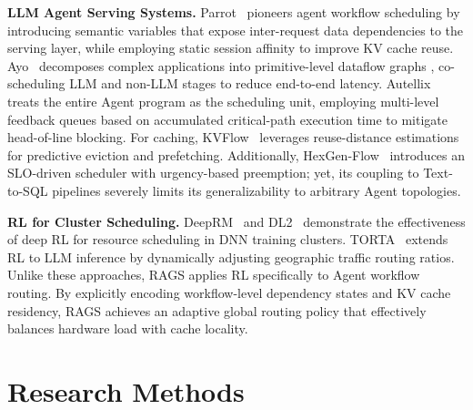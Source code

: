 \documentclass[sigconf,review,anonymous]{acmart}
\begin{document}
\textbf{LLM Agent Serving Systems.}
Parrot~\cite{lin2024parrot} pioneers agent workflow scheduling by introducing semantic 
variables that expose inter-request data dependencies to the serving layer, while 
employing static session affinity to improve KV cache reuse. 
Ayo~\cite{tan2025towards}
decomposes complex applications into primitive-level dataflow graphs
, co-scheduling LLM and non-LLM stages to reduce end-to-end latency. 
Autellix~\cite{luo2025autellix} treats the entire Agent program as the scheduling unit, 
employing multi-level feedback queues based on accumulated critical-path execution time 
to mitigate head-of-line blocking. For caching, KVFlow~\cite{pan2025kvflow} leverages 
reuse-distance estimations for predictive eviction and prefetching. Additionally, HexGen-Flow~\cite{peng2025hexgen} introduces an SLO-driven 
scheduler with urgency-based preemption; yet, its coupling to Text-to-SQL pipelines 
severely limits its generalizability to arbitrary Agent topologies.

\textbf{RL for Cluster Scheduling.}
DeepRM~\cite{mao2016resource} and DL2~\cite{peng2021dl2} demonstrate the
effectiveness of deep RL for resource scheduling in DNN training clusters.
TORTA~\cite{du2025temporal} extends RL to LLM inference by dynamically 
adjusting geographic traffic routing ratios. Unlike
these approaches, RAGS applies RL specifically to Agent workflow routing. 
By explicitly encoding workflow-level dependency states and KV cache residency, 
RAGS achieves an adaptive global routing policy that effectively balances hardware 
load with cache locality.






\iffalse
\appendix

\section{Research Methods}
\end{document}
